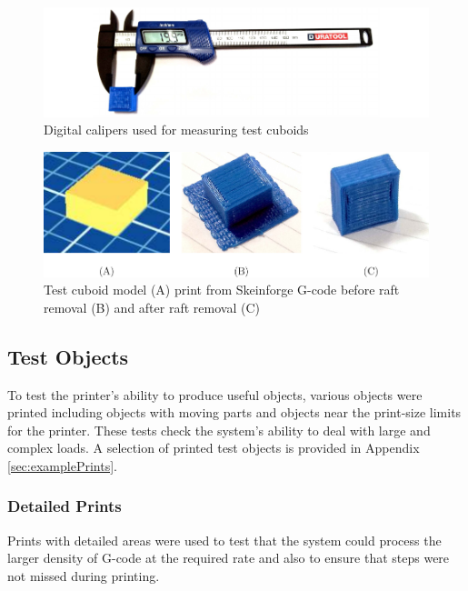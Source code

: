 			\begin{figure}
				\includegraphics[width=1\textwidth]{diagrams/calipers.pdf}
				\caption{Digital calipers used for measuring test cuboids}
				\label{fig:calipers}
			\end{figure}
			
			\begin{figure}
				\includegraphics[width=1\textwidth]{diagrams/testCubes.pdf}
				\caption{Test cuboid model (A) print from Skeinforge G-code before raft
				         removal (B) and after raft removal (C)}
				\label{fig:testCubes}
			\end{figure}
			
		
		\subsection{Test Objects}
			
			To test the printer's ability to produce useful objects, various objects
			were printed including objects with moving parts and objects near the
			print-size limits for the printer. These tests check the system's ability
			to deal with large and complex loads. A selection of printed test objects
			is provided in Appendix \ref{sec:examplePrints}.
			
			\subsubsection{Detailed Prints}
				
				Prints with detailed areas were used to test that the system could
				process the larger density of G-code at the required rate and also to
				ensure that steps were not missed during printing.
				
